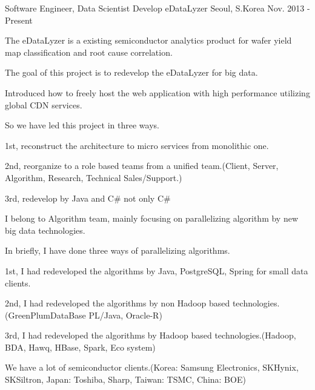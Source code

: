 

\begin{cventries}

  \cventry
    {Software Engineer, Data Scientist} %
    {Develop eDataLyzer} %
    {Seoul, S.Korea} %
    {Nov. 2013 - Present} %
    {
      \begin{cvitems} %
        \item {The eDataLyzer is a existing semiconductor analytics product for wafer yield map classification and root cause correlation.}
        \item {The goal of this project is to redevelop the eDataLyzer for big data.}
        \item {Introduced how to freely host the web application with high performance utilizing global CDN services.}
        \item {So we have led this project in three ways.}
        \item {1st, reconstruct the architecture to micro services from monolithic one.}
        \item {2nd, reorganize to a role based teams from a unified team.(Client, Server, Algorithm, Research, Technical Sales/Support.)}
        \item {3rd, redevelop by Java and C\# not only C\#}
        \item {I belong to Algorithm team, mainly focusing on parallelizing algorithm by new big data technologies.}
        \item {In briefly, I have done three ways of parallelizing algorithms.}
        \item {1st, I had redeveloped the algorithms by Java, PostgreSQL, Spring for small data clients.}
        \item {2nd, I had redeveloped the algorithms by non Hadoop based technologies.(GreenPlumDataBase PL/Java, Oracle-R)}
        \item {3rd, I had redeveloped the algorithms by Hadoop based technologies.(Hadoop, BDA, Hawq, HBase, Spark, Eco system)}
        \item {We have a lot of semiconductor clients.(Korea: Samsung Electronics, SKHynix, SKSiltron, Japan: Toshiba, Sharp, Taiwan: TSMC, China: BOE)}
      \end{cvitems}
    }


\end{cventries}
